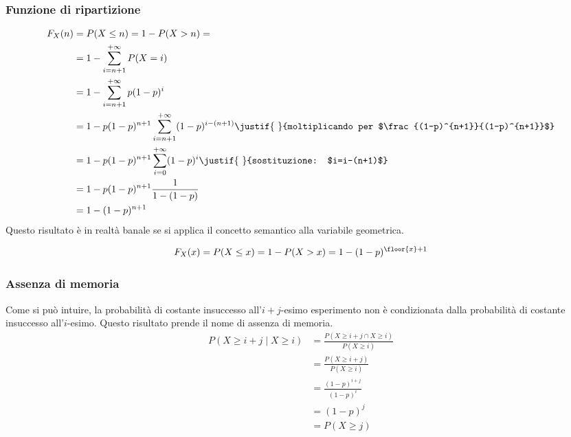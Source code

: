 \subsubsection{Funzione di ripartizione}
\begin{align*}
	F_X(n) & = P(X\leq n) = 1-P(X>n) =                                                                                                 \\
	       & = 1 - \sum_{i=n+1}^{+\infty} P(X=i)                                                                                       \\
	       & = 1 - \sum_{i=n+1}^{+\infty} p(1-p)^i                                                                                     \\
	       & = 1 - p(1-p)^{n+1} \sum_{i=n+1}^{+\infty} (1-p)^{i-(n+1)} \justif{~}{moltiplicando per $\frac{(1-p)^{n+1}}{(1-p)^{n+1}}$} \\
	       & = 1 - p(1-p)^{n+1} \sum_{i=0}^{+\infty} (1-p)^i \justif{~}{sostituzione: $i=i-(n+1)$}                                     \\
	       & = 1 - p(1-p)^{n+1} \frac{1}{1-(1-p)}                                                                                      \\
	       & = 1 - (1-p)^{n+1}                                                                                                         \\
\end{align*}
Questo risultato è in realtà banale se si applica il concetto semantico alla variabile geometrica.

\begin{equation*}
	F_X(x) = P(X\leq x) = 1-P(X>x) = 1-(1-p)^{\floor{x}+1}
\end{equation*}

\subsubsection{Assenza di memoria} \label{geom-assmem}
Come si può intuire, la probabilità di costante insuccesso all'$i+j$-esimo esperimento non è condizionata dalla probabilità di costante insuccesso all'$i$-esimo. Questo risultato prende il nome di assenza di memoria.
\begin{align*}
	P(X\geq i+j \mid X\geq i) & = \frac{P(X\geq i+j \cap X\geq i)}{P(X\geq i)} \\
	                          & = \frac{P(X\geq i+j)}{P(X\geq i)}              \\
	                          & = \frac{(1-p)^{i+j}}{(1-p)^i}                  \\
	                          & = (1-p)^j                                      \\
	                          & = P(X\geq j)
\end{align*}



